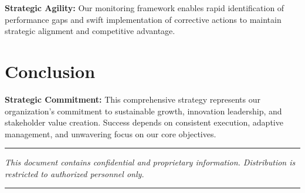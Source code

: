 \documentclass[11pt,a4paper]{article}
\begin{document}
\begin{highlight}
\textbf{Strategic Agility:} Our monitoring framework enables rapid identification of performance gaps and swift implementation of corrective actions to maintain strategic alignment and competitive advantage.
\end{highlight}

\section{Conclusion}

\lipsum[43-44]

\begin{keypoint}
\textbf{Strategic Commitment:} This comprehensive strategy represents our organization's commitment to sustainable growth, innovation leadership, and stakeholder value creation. Success depends on consistent execution, adaptive management, and unwavering focus on our core objectives.
\end{keypoint}

\lipsum[45]

\vspace{2cm}
\begin{center}
\textcolor{secondary}{\rule{0.5\textwidth}{0.5pt}}

\textcolor{secondary}{\textit{This document contains confidential and proprietary information. Distribution is restricted to authorized personnel only.}}

\textcolor{secondary}{\rule{0.5\textwidth}{0.5pt}}
\end{center}
\end{document}
